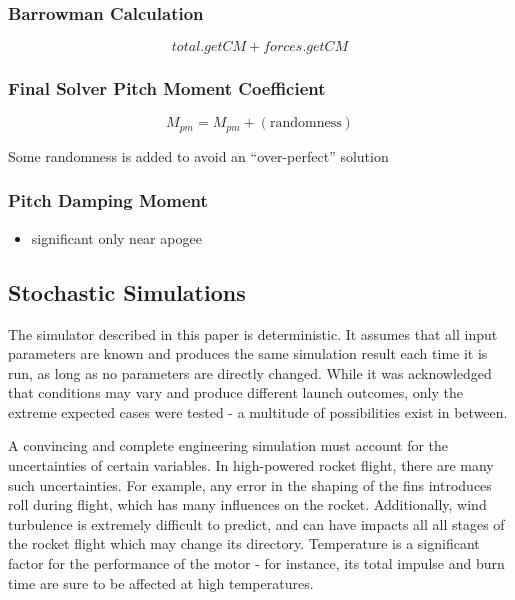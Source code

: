 \documentclass[]{article}
\providecommand{\tightlist}{%
  \setlength{\itemsep}{0pt}\setlength{\parskip}{0pt}}
\begin{document}
\subsubsection{Barrowman Calculation}\label{barrowman-calculation}

\begin{equation}
total.getCM + forces.getCM
\end{equation}

\subsubsection{Final Solver Pitch Moment
Coefficient}\label{final-solver-pitch-moment-coefficient}

\begin{equation}
M_{pm} = M_{pm} + \left( \text{randomness}  \right)
\end{equation}

Some randomness is added to avoid an ``over-perfect'' solution

\subsubsection{Pitch Damping Moment}\label{pitch-damping-moment-1}

\begin{itemize}
\tightlist
\item
  significant only near apogee
\end{itemize}

\subsection{Stochastic Simulations}\label{stochastic-simulations}

The simulator described in this paper is deterministic. It assumes that
all input parameters are known and produces the same simulation result
each time it is run, as long as no parameters are directly changed.
While it was acknowledged that conditions may vary and produce different
launch outcomes, only the extreme expected cases were tested - a
multitude of possibilities exist in between.

A convincing and complete engineering simulation must account for the
uncertainties of certain variables. In high-powered rocket flight, there
are many such uncertainties. For example, any error in the shaping of
the fins introduces roll during flight, which has many influences on the
rocket. Additionally, wind turbulence is extremely difficult to predict,
and can have impacts all all stages of the rocket flight which may
change its directory. Temperature is a significant factor for the
performance of the motor - for instance, its total impulse and burn time
are sure to be affected at high temperatures.
\end{document}
